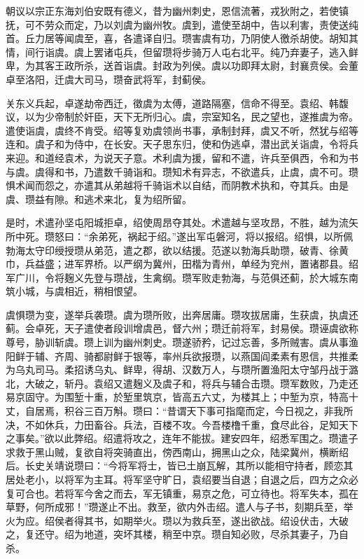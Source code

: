 \documentclass[12pt,UTF8]{ctexbook}
\begin{document}
朝议以宗正东海刘伯安既有德义，昔为幽州刺史，恩信流著，戎狄附之，若使镇抚，可不劳众而定，乃以刘虞为幽州牧。虞到，遣使至胡中，告以利害，责使送纯首。丘力居等闻虞至，喜，各遣译自归。瓒害虞有功，乃阴使人徼杀胡使。胡知其情，间行诣虞。虞上罢诸屯兵，但留瓒将步骑万人屯右北平。纯乃弃妻子，逃入鲜卑，为其客王政所杀，送首诣虞。封政为列侯。虞以功即拜太尉，封襄贲侯。会董卓至洛阳，迁虞大司马，瓒奋武将军，封蓟侯。

关东义兵起，卓遂劫帝西迁，徵虞为太傅，道路隔塞，信命不得至。袁绍、韩馥议，以为少帝制於奸臣，天下无所归心。虞，宗室知名，民之望也，遂推虞为帝。遣使诣虞，虞终不肯受。绍等复劝虞领尚书事，承制封拜，虞又不听，然犹与绍等连和。虞子和为侍中，在长安。天子思东归，使和伪逃卓，潜出武关诣虞，令将兵来迎。和道经袁术，为说天子意。术利虞为援，留和不遣，许兵至俱西，令和为书与虞。虞得和书，乃遣数千骑诣和。瓒知术有异志，不欲遣兵，止虞，虞不可。瓒惧术闻而怨之，亦遣其从弟越将千骑诣术以自结，而阴教术执和，夺其兵。由是虞、瓒益有隙。和逃术来北，复为绍所留。

是时，术遣孙坚屯阳城拒卓，绍使周昂夺其处。术遣越与坚攻昂，不胜，越为流矢所中死。瓒怒曰：“余弟死，祸起于绍。”遂出军屯磐河，将以报绍。绍惧，以所佩勃海太守印绶授瓒从弟范，遣之郡，欲以结援。范遂以勃海兵助瓒，破青、徐黄巾，兵益盛；进军界桥。以严纲为冀州，田楷为青州，单经为兖州，置诸郡县。绍军广川，令将麹义先登与瓒战，生禽纲。瓒军败走勃海，与范俱还蓟，於大城东南筑小城，与虞相近，稍相恨望。

虞惧瓒为变，遂举兵袭瓒。虞为瓒所败，出奔居庸。瓒攻拔居庸，生获虞，执虞还蓟。会卓死，天子遣使者段训增虞邑，督六州；瓒迁前将军，封易侯。瓒诬虞欲称尊号，胁训斩虞。瓒上训为幽州刺史。瓒遂骄矜，记过忘善，多所贼害。虞从事渔阳鲜于辅、齐周、骑都尉鲜于银等，率州兵欲报瓒，以燕国阎柔素有恩信，共推柔为乌丸司马。柔招诱乌丸、鲜卑，得胡、汉数万人，与瓒所置渔阳太守邹丹战于潞北，大破之，斩丹。袁绍又遣麹义及虞子和，将兵与辅合击瓒。瓒军数败，乃走还易京固守。为围堑十重，於堑里筑京，皆高五六丈，为楼其上；中堑为京，特高十丈，自居焉，积谷三百万斛。瓒曰：“昔谓天下事可指麾而定，今日视之，非我所决，不如休兵，力田畜谷。兵法，百楼不攻。今吾楼橹千重，食尽此谷，足知天下之事矣。”欲以此弊绍。绍遣将攻之，连年不能拔。建安四年，绍悉军围之。瓒遣子求救于黑山贼，复欲自将突骑直出，傍西南山，拥黑山之众，陆梁冀州，横断绍后。长史关靖说瓒曰：“今将军将士，皆已土崩瓦解，其所以能相守持者，顾恋其居处老小，以将军为主耳。将军坚守旷日，袁绍要当自退；自退之后，四方之众必复可合也。若将军今舍之而去，军无镇重，易京之危，可立待也。将军失本，孤在草野，何所成邪！”瓒遂止不出。救至，欲内外击绍。遣人与子书，刻期兵至，举火为应。绍侯者得其书，如期举火。瓒以为救兵至，遂出欲战。绍设伏击，大破之，复还守。绍为地道，突坏其楼，稍至中京。瓒自知必败，尽杀其妻子，乃自杀。
\end{document}
